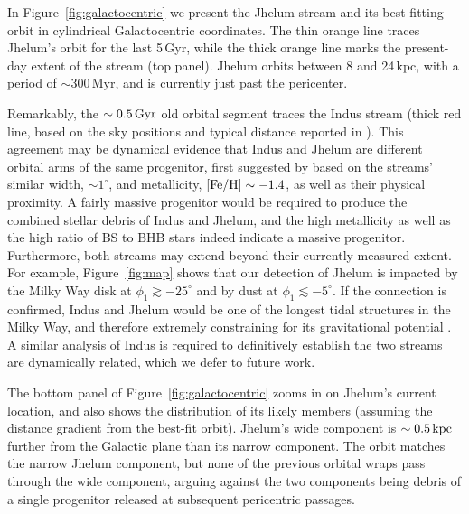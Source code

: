 \documentclass[twocolumn]{aastex62}
\begin{document}
In Figure~\ref{fig:galactocentric} we present the Jhelum stream and its best-fitting orbit in cylindrical Galactocentric coordinates.
The thin orange line traces Jhelum's orbit for the last 5\,Gyr, while the thick orange line marks the present-day extent of the stream (top panel).
Jhelum orbits between 8 and 24\,kpc, with a period of $\sim300$\,Myr, and is currently just past the pericenter.

Remarkably, the $\sim0.5\,\rm{Gyr}$ old orbital segment traces the Indus stream (thick red line, based on the sky positions and typical distance reported in \citealt{shipp2018}).
This agreement may be dynamical evidence that Indus and Jhelum are different orbital arms of the same progenitor, first suggested by \citet{shipp2018} based on the streams' similar width, $\sim1^\circ$, and metallicity, $\rm[Fe/H]\sim-1.4$, as well as their physical proximity.
A fairly massive progenitor would be required to produce the combined stellar debris of Indus and Jhelum, and the high metallicity as well as the high ratio of BS to BHB stars indeed indicate a massive progenitor.
Furthermore, both streams may extend beyond their currently measured extent.
For example, Figure~\ref{fig:map} shows that our detection of Jhelum is impacted by the Milky Way disk at $\phi_1\gtrsim-25^\circ$ and by dust at $\phi_1\lesssim-5^\circ$.
If the connection is confirmed, Indus and Jhelum would be one of the longest tidal structures in the Milky Way, and therefore extremely constraining for its gravitational potential \citep{bh2018}.
A similar analysis of Indus is required to definitively establish the two streams are dynamically related, which we defer to future work.

The bottom panel of Figure~\ref{fig:galactocentric} zooms in on Jhelum's current location, and also shows the distribution of its likely members (assuming the distance gradient from the best-fit orbit).
Jhelum's wide component is $\sim0.5\,\rm kpc$ further from the Galactic plane than its narrow component.
The orbit matches the narrow Jhelum component, but none of the previous orbital wraps pass through the wide component, arguing against the two components being debris of a single progenitor released at subsequent pericentric passages.
\end{document}

